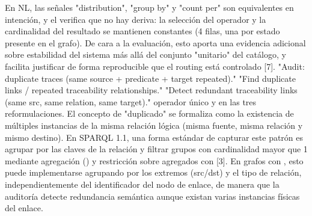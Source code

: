 {}En NL, las señales "distribution", "group by" y "count per" son equivalentes en intención, y el  verifica que no hay deriva: la selección del operador y la cardinalidad del resultado se mantienen constantes (4 filas, una por estado presente en el grafo). De cara a la evaluación, esto aporta una evidencia adicional sobre estabilidad del sistema más allá del conjunto "unitario" del catálogo, y facilita justificar de forma reproducible que el routing está controlado [7].\markdownRendererInterblockSeparator
{}\markdownRendererInterblockSeparator
{}\markdownRendererUlBeginTight
\markdownRendererUlItem {} \markdownRendererUlItemEnd 
\markdownRendererUlItem {}\markdownRendererInterblockSeparator
{}\markdownRendererUlBeginTight
\markdownRendererUlItem "Audit: duplicate traces (same source + predicate + target repeated)."\markdownRendererUlItemEnd 
\markdownRendererUlItem "Find duplicate links / repeated traceability relationships."\markdownRendererUlItemEnd 
\markdownRendererUlItem "Detect redundant traceability links (same src, same relation, same target)."\markdownRendererUlItemEnd 
\markdownRendererUlEndTight \markdownRendererUlItemEnd 
\markdownRendererUlItem {} operador único  y  en las tres reformulaciones.\markdownRendererUlItemEnd 
\markdownRendererUlEndTight \markdownRendererInterblockSeparator
{} El concepto de "duplicado" se formaliza como la existencia de múltiples instancias de la misma relación lógica (misma fuente, misma relación y mismo destino). En SPARQL 1.1, una forma estándar de capturar este patrón es agrupar por las claves de la relación y filtrar grupos con cardinalidad mayor que 1 mediante agregación () y restricción sobre agregados con  [3]. En grafos con , esto puede implementarse agrupando por los extremos (src/dst) y el tipo de relación, independientemente del identificador del nodo de enlace, de manera que la auditoría detecte redundancia semántica aunque existan varias instancias físicas del enlace.\markdownRendererInterblockSeparator
